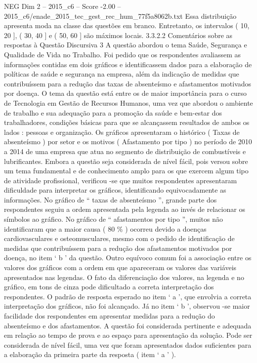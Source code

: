 \begin{textsample}{NEG Dim 2 – 2015\_c6 – Score -2.00 – 2015\_c6/enade\_2015\_tec\_gest\_rec\_hum\_77f5a8062b.txt}
Essa distribuição apresenta moda na classe das questões em branco.
Entretanto, os intervalos ( 10, 20 ], ( 30, 40 ] e ( 50, 60 ] são máximos locais. 3.3.2.2 Comentários sobre as respostas à Questão Discursiva 3 A questão abordou o tema Saúde, Segurança e Qualidade de Vida no Trabalho.
Foi pedido que os respondentes avaliassem as informações contidas em dois gráficos e identificassem dados para a elaboração de políticas de saúde e segurança na empresa, além da indicação de medidas que contribuíssem para a redução das taxas de absenteísmo e afastamentos motivados por doença.
O tema da questão está entre os de maior importância para o curso de Tecnologia em Gestão de Recursos Humanos, uma vez que abordou o ambiente de trabalho e sua adequação para a promoção da saúde e bem-estar dos trabalhadores, condições básicas para que se alcançassem resultados de ambos os lados : pessoas e organização.
Os gráficos apresentaram o histórico ( Taxas de absenteísmo ) por setor e os motivos ( Afastamento por tipo ) no período de 2010 a 2014 de uma empresa que atua no segmento de distribuição de combustíveis e lubrificantes.
Embora a questão seja considerada de nível fácil, pois versou sobre um tema fundamental e de conhecimento amplo para os que exercem algum tipo de atividade profissional, verificou -se que muitos respondentes apresentaram dificuldade para interpretar os gráficos, identificando equivocadamente as informações.
No gráfico de “ taxas de absenteísmo ”, grande parte dos respondentes seguiu a ordem apresentada pela legenda ao invés de relacionar os símbolos ao gráfico.
No gráfico de “ afastamentos por tipo ”, muitos não identificaram que a maior causa ( 80 \% ) ocorreu devido a doenças cardiovasculares e osteomusculares, mesmo com o pedido de identificação de medidas que contribuíssem para a redução dos afastamentos motivados por doença, no item ‘ b ’ da questão.
Outro equívoco comum foi a associação entre os valores dos gráficos com a ordem em que apareceram os valores das variáveis apresentados nas legendas.
O fato da diferenciação dos valores, na legenda e no gráfico, em tons de cinza pode dificultado a correta interpretação dos respondentes.
O padrão de resposta esperado no item ‘ a ’, que envolvia a correta interpretação dos gráficos, não foi alcançado.
Já no item ‘ b ’, observou -se maior facilidade dos respondentes em apresentar medidas para a redução do absenteísmo e dos afastamentos.
A questão foi considerada pertinente e adequada em relação ao tempo de prova e ao espaço para apresentação da solução.
Pode ser considerada de nível fácil, uma vez que foram apresentados dados suficientes para a elaboração da primeira parte da resposta ( item ‘ a ’ ).

\end{textsample}
